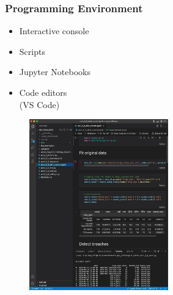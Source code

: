 \begin{frame}\frametitle{Programming Environment}

   \begin{minipage}{0.4\linewidth}
      \begin{itemize}
         \item Interactive console   
         \item Scripts
         \item Jupyter Notebooks
         \item Code editors\\(VS Code)
      \end{itemize}
   \end{minipage}
   \begin{minipage}{0.58\linewidth}
      \begin{figure}[H]
         \includegraphics[width=6cm]{../images/illustrations/vscode.jpg}
      \end{figure}
   \end{minipage}
\end{frame}



